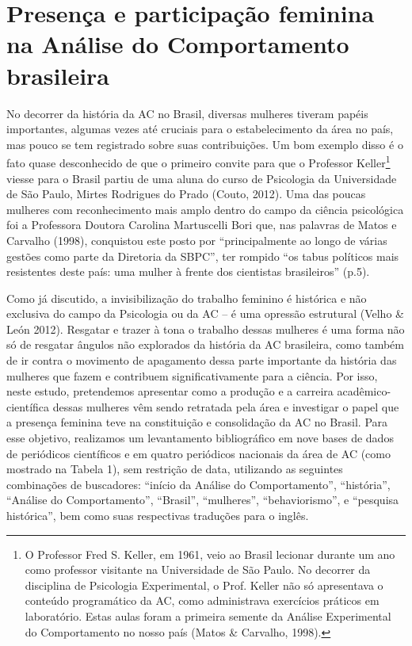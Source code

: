 \section{Presença e participação feminina na Análise do Comportamento brasileira}

No decorrer da história da AC no Brasil, diversas mulheres tiveram papéis importantes, algumas vezes até cruciais para o estabelecimento da área no país, mas pouco se tem registrado sobre suas contribuições. Um bom exemplo disso é o fato quase desconhecido de que o primeiro convite para que o Professor Keller\footnote{O Professor Fred S. Keller, em 1961, veio ao Brasil lecionar durante um ano como professor visitante na Universidade de São Paulo. No decorrer da disciplina de Psicologia Experimental, o Prof. Keller não só apresentava o conteúdo programático da AC, como administrava exercícios práticos em laboratório. Estas aulas foram a primeira semente da Análise Experimental do Comportamento no nosso país (Matos \& Carvalho, 1998).} viesse para o Brasil partiu de uma aluna do curso de Psicologia da Universidade de São Paulo, Mirtes Rodrigues do Prado (Couto, 2012). Uma das poucas mulheres com reconhecimento mais amplo dentro do campo da ciência psicológica foi a Professora Doutora Carolina Martuscelli Bori que, nas palavras de Matos e Carvalho (1998), conquistou este posto por “principalmente ao longo de várias gestões como parte da Diretoria da SBPC”, ter rompido “os tabus políticos mais resistentes deste país: uma mulher à frente dos cientistas brasileiros” (p.5).

Como já discutido, a invisibilização do trabalho feminino é histórica e não exclusiva do campo da Psicologia ou da AC – é uma opressão estrutural (Velho \& León 2012). Resgatar e trazer à tona o trabalho dessas mulheres é uma forma não só de resgatar ângulos não explorados da história da AC brasileira, como também de ir contra o movimento de apagamento dessa parte importante da história das mulheres que fazem e contribuem significativamente para a ciência. Por isso, neste estudo, pretendemos apresentar como a produção e a carreira acadêmico-científica dessas mulheres vêm sendo retratada pela área e investigar o papel que a presença feminina teve na constituição e consolidação da AC no Brasil. Para esse objetivo, realizamos um levantamento bibliográfico em nove bases de dados de periódicos científicos e em quatro periódicos nacionais da área de AC (como mostrado na Tabela 1), sem restrição de data, utilizando as seguintes combinações de buscadores: “início da Análise do Comportamento”, “história”, “Análise do Comportamento”, “Brasil”, “mulheres”, “behaviorismo”, e “pesquisa histórica”, bem como suas respectivas traduções para o inglês.

